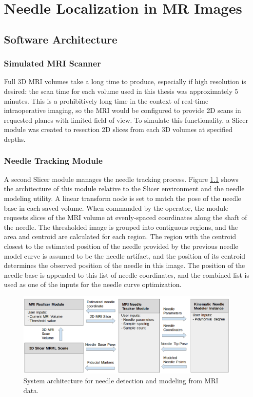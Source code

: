 \chapter{Needle Localization in MR Images}
\label{sec:mritracking} %

\section{Software Architecture}
\subsection{Simulated MRI Scanner}
Full 3D MRI volumes take a long time to produce, especially if high resolution is desired: the scan time for each volume used in this thesis was approximately 5 minutes. This is a prohibitively long time in the context of real-time intraoperative imaging, so the MRI would be configured to provide 2D scans in requested planes with limited field of view. To simulate this functionality, a  Slicer module was created to resection 2D slices from each 3D volumes at specified depths.

\subsection{Needle Tracking Module}
A second Slicer module manages the needle tracking process. Figure \ref{fig:MRI_architecture} shows the architecture of this module relative to the Slicer environment and the needle modeling utility. A linear transform node is set to match the pose of the needle base in each saved volume. When commanded by the operator, the module requests slices of the MRI volume at evenly-spaced coordinates along the shaft of the needle. The thresholded image is grouped into contiguous regions, and the area and centroid are calculated for each region. The region with the centroid closest to the estimated position of the needle provided by the previous needle model curve is assumed to be the needle artifact, and the position of its centroid determines the observed position of the needle in this image. The position of the needle base is appended to this list of needle coordinates, and the combined list is used as one of the inputs for the needle curve optimization.

\begin{figure}[h]
\includegraphics[width=1.0\textwidth]{Fig/chap5/MRI_software_architecture.png}
\caption{System architecture for needle detection and modeling from MRI data.}
\label{fig:MRI_architecture}
\end{figure}

